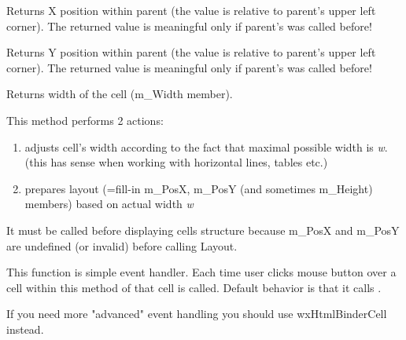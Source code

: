 
Returns X position within parent (the value is relative to parent's
upper left corner). The returned value is meaningful only if
parent's  was called before!

\label{wxhtmlcellgetposy}


Returns Y position within parent (the value is relative to parent's
upper left corner). The returned value is meaningful only if
parent's  was called before!

\label{wxhtmlcellgetwidth}


Returns width of the cell (m\_Width member).

\label{wxhtmlcelllayout}


This method performs 2 actions:

\begin{enumerate}\itemsep=0pt
\item adjusts cell's width according to the fact that maximal possible width is {\it w}.
(this has sense when working with horizontal lines, tables etc.)
\item prepares layout (=fill-in m\_PosX, m\_PosY (and sometimes m\_Height) members)
based on actual width {\it w}
\end{enumerate}

It must be called before displaying cells structure because
m\_PosX and m\_PosY are undefined (or invalid)
before calling Layout.

\label{wxhtmlcellonmouseclick}


This function is simple event handler. Each time user clicks mouse button over a cell
within  this method of that cell is called. Default behavior is
that it calls .


If you need more "advanced" event handling
you should use wxHtmlBinderCell instead.

